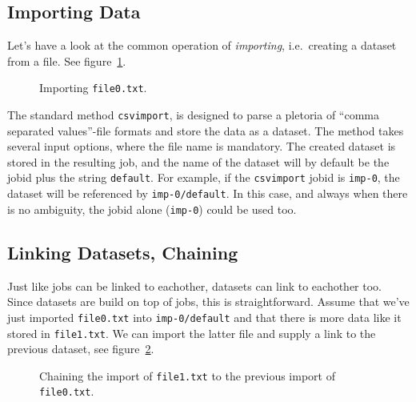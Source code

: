 \documentclass[a4paper]{article}
\begin{document}
\subsection{Importing Data}

Let's have a look at the common operation of \textsl{importing},
i.e.\ creating a dataset from a file.  See
figure~\ref{fig:dataset_csvimport}.

\begin{figure}[h!]
  \begin{center}
    
    \caption{Importing \texttt{file0.txt}.}
    \label{fig:dataset_csvimport}
  \end{center}
\end{figure}

\noindent The standard method \texttt{csvimport}, is designed to parse
a pletoria of ``comma separated values''-file formats and store the
data as a dataset.  The method takes several input options, where the
file name is mandatory.  The created dataset is stored in the
resulting job, and the name of the dataset will by default be the
jobid plus the string \texttt{default}.  For example, if the
\texttt{csvimport} jobid is \texttt{imp-0}, the dataset will be
referenced by \texttt{imp-0/default}.  In this case, and always when
there is no ambiguity, the jobid alone (\texttt{imp-0}) could be used
too.

\clearpage




\subsection{Linking Datasets, Chaining}

Just like jobs can be linked to eachother, datasets can link to
eachother too.  Since datasets are build on top of jobs, this is
straightforward.  Assume that we've just imported \texttt{file0.txt}
into \texttt{imp-0/default} and that there is more data like it stored
in \texttt{file1.txt}.  We can import the latter file and supply a
link to the previous dataset, see
figure~\ref{fig:dataset_csvimport_chain}.

\begin{figure}[h!]
  \begin{center}
    
    \caption{Chaining the import of \texttt{file1.txt} to the previous
      import of \texttt{file0.txt}.}
    \label{fig:dataset_csvimport_chain}
  \end{center}
\end{figure}
\end{document}
